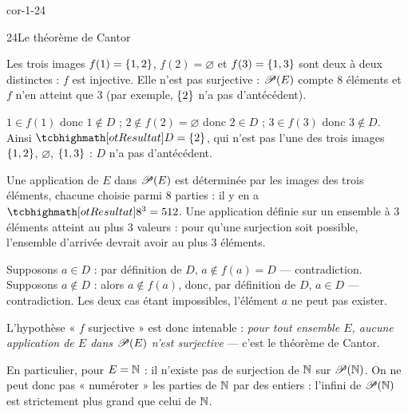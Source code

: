 \begin{blocLivre}{cor-1-24}
\begin{corrige}{24}{Le théorème de Cantor}
\begin{questions}
  \item Les trois images $f(1)=\left\{1,2\right\}$, $f(2)=\varnothing$ et $f(3)=\left\{1,3\right\}$ sont deux à deux
    distinctes : $f$ est injective. Elle n'est pas surjective : $\mathscr{P}(E)$ compte $8$ éléments et
    $f$ n'en atteint que $3$ (par exemple, $\left\{2\right\}$ n'a pas d'antécédent).
  \item $1\in f(1)$ donc $1\notin D$ ; $2\notin f(2)=\varnothing$ donc $2\in D$ ; $3\in f(3)$ donc
    $3\notin D$. Ainsi $\res{D=\ens{2}}$, qui n'est pas l'une des trois images $\left\{1,2\right\}$,
    $\varnothing$, $\left\{1,3\right\}$ : $D$ n'a pas d'antécédent.
  \item Une application de $E$ dans $\mathscr{P}(E)$ est déterminée par les images des trois éléments,
    chacune choisie parmi $8$ parties : il y en a $\res{8^{3}=512}$. Une application définie sur un
    ensemble à $3$ éléments atteint au plus $3$ valeurs : pour qu'une surjection soit possible,
    l'ensemble d'arrivée devrait avoir au plus $3$ éléments.
  \item Supposons $a\in D$ : par définition de $D$, $a\notin f(a)=D$ — contradiction. Supposons
    $a\notin D$ : alors $a\notin f(a)$, donc, par définition de $D$, $a\in D$ — contradiction. Les
    deux cas étant impossibles, l'élément $a$ ne peut pas exister.
  \item L'hypothèse « $f$ surjective » est donc intenable : \emph{pour tout ensemble $E$, aucune
    application de $E$ dans $\mathscr{P}(E)$ n'est surjective} — c'est le théorème de Cantor.
  \item En particulier, pour $E=\mathbb{N}$ : il n'existe pas de surjection de $\mathbb{N}$ sur $\mathscr{P}(\mathbb{N})$. On ne
    peut donc pas « numéroter » les parties de $\mathbb{N}$ par des entiers : l'infini de $\mathscr{P}(\mathbb{N})$ est
    strictement plus grand que celui de $\mathbb{N}$.
\end{questions}
\end{corrige}
\end{blocLivre}


